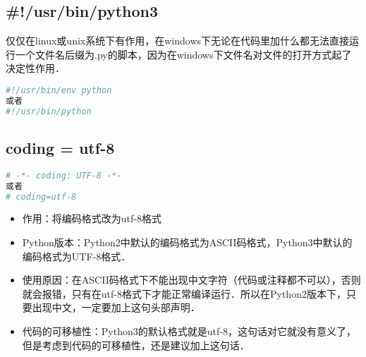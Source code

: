 \subsection{#!/usr/bin/python3 }
仅仅在linux或unix系统下有作用，在windows下无论在代码里加什么都无法直接运行一个文件名后缀为.py的脚本，因为在windows下文件名对文件的打开方式起了决定性作用．
\begin{lstlisting}[language=python]
#!/usr/bin/env python
或者
#!/usr/bin/python
\end{lstlisting}


\subsection{coding = utf-8 }
\begin{lstlisting}[language=python]
# -*- coding: UTF-8 -*-
或者
# coding=utf-8
\end{lstlisting}
\begin{itemize}
\item 作用：将编码格式改为utf-8格式
\item Python版本：Python2中默认的编码格式为ASCII码格式，Python3中默认的编码格式为UTF-8格式．
\item 使用原因：在ASCII码格式下不能出现中文字符（代码或注释都不可以），否则就会报错，只有在utf-8格式下才能正常编译运行．所以在Python2版本下，只要出现中文，一定要加上这句头部声明．
\item 代码的可移植性：Python3的默认格式就是utf-8，这句话对它就没有意义了，但是考虑到代码的可移植性，还是建议加上这句话．
\end{itemize}

